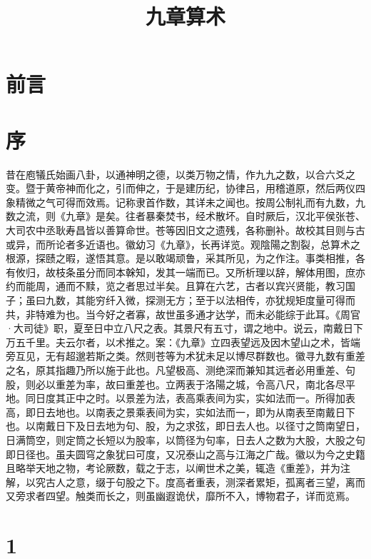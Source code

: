 \documentclass[a4paper,12pt,UTF8,twoside]{ctexbook}
\title{\heiti\zihao{0} 九章算术}
\author{}
\date{}
\begin{document}
\maketitle
\tableofcontents

\frontmatter
\chapter{前言}

\chapter{序}

昔在庖犠氏始画八卦，以通神明之德，以类万物之情，作九九之数，以合六爻之变。暨于黄帝神而化之，引而伸之，于是建历纪，协律吕，用稽道原，然后两仪四象精微之气可得而效焉。记称隶首作数，其详未之闻也。按周公制礼而有九数，九数之流，则《九章》是矣。往者暴秦焚书，经术散坏。自时厥后，汉北平侯张苍、大司农中丞耿寿昌皆以善算命世。苍等因旧文之遗残，各称删补。故校其目则与古或异，而所论者多近语也。徽幼习《九章》，长再详览。观陰陽之割裂，总算术之根源，探赜之暇，遂悟其意。是以敢竭顽鲁，采其所见，为之作注。事类相推，各有攸归，故枝条虽分而同本榦知，发其一端而已。又所析理以辞，解体用图，庶亦约而能周，通而不黩，览之者思过半矣。且算在六艺，古者以宾兴贤能，教习国子；虽曰九数，其能穷纤入微，探测无方；至于以法相传，亦犹规矩度量可得而共，非特难为也。当今好之者寡，故世虽多通才达学，而未必能综于此耳。《周官·大司徒》职，夏至日中立八尺之表。其景尺有五寸，谓之地中。说云，南戴日下万五千里。夫云尔者，以术推之。案：《九章》立四表望远及因木望山之术，皆端旁互见，无有超邈若斯之类。然则苍等为术犹未足以博尽群数也。徽寻九数有重差之名，原其指趣乃所以施于此也。凡望极高、测绝深而兼知其远者必用重差、句股，则必以重差为率，故曰重差也。立两表于洛陽之城，令高八尺，南北各尽平地。同日度其正中之时。以景差为法，表高乘表间为实，实如法而一。所得加表高，即日去地也。以南表之景乘表间为实，实如法而一，即为从南表至南戴日下也。以南戴日下及日去地为句、股，为之求弦，即日去人也。以径寸之筒南望日，日满筒空，则定筒之长短以为股率，以筒径为句率，日去人之数为大股，大股之句即日径也。虽夫圆穹之象犹曰可度，又况泰山之高与江海之广哉。徽以为今之史籍且略举天地之物，考论厥数，载之于志，以阐世术之美，辄造《重差》，并为注解，以究古人之意，缀于句股之下。度高者重表，测深者累矩，孤离者三望，离而又旁求者四望。触类而长之，则虽幽遐诡伏，靡所不入，博物君子，详而览焉。 

\mainmatter
\chapter{1}
\end{document}
